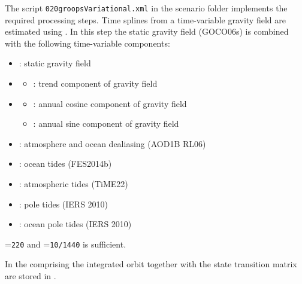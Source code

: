 The script \verb|020groopsVariational.xml| in the scenario folder implements the required processing steps.
Time splines from a time-variable gravity field are estimated using .
In this step the static gravity field (GOCO06s) is combined with the following time-variable components:
\begin{itemize}
    \item {}:
    static gravity field
    \item {}
    \begin{itemize}
        \item {}:
      trend component of gravity field
    \end{itemize}
    \item {}
    \begin{itemize}
        \item {}:
      annual cosine component of gravity field
        \item {}:
      annual sine component of gravity field
    \end{itemize}
    \item {}: atmosphere and ocean dealiasing (AOD1B RL06)
    \item {}: ocean tides (FES2014b)
    \item {}: atmospheric tides (TiME22)
    \item {}: pole tides (IERS 2010)
    \item {}: ocean pole tides (IERS 2010)
\end{itemize}
=\verb|220| and =\verb|10/1440| is sufficient.

In  the 
comprising the integrated orbit together with the state transition matrix are stored in
.

